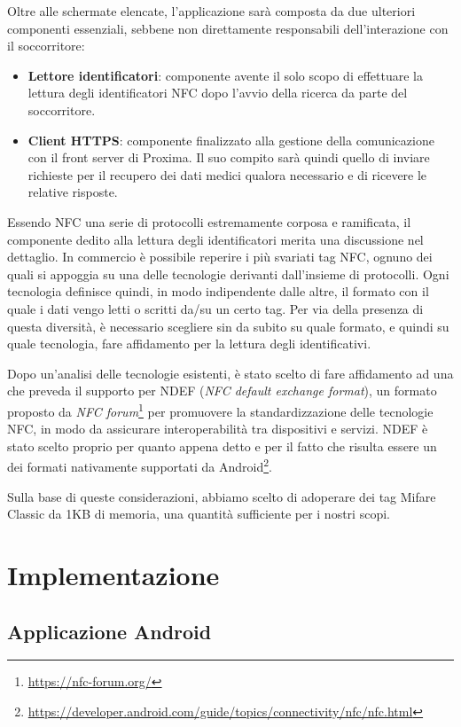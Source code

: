 \documentclass[a4paper,12pt]{report}
\begin{document}
Oltre alle schermate elencate, l'applicazione sarà composta da due ulteriori componenti essenziali, sebbene non direttamente responsabili dell'interazione con il soccorritore:
\begin{itemize}
	\item \textbf{Lettore identificatori}: componente avente il solo scopo di effettuare la lettura degli identificatori NFC dopo l'avvio della ricerca da parte del soccorritore.
	\item \textbf{Client HTTPS}: componente finalizzato alla gestione della comunicazione con il front server di Proxima. Il suo compito sarà quindi quello di inviare richieste per il recupero dei dati medici qualora necessario e di ricevere le relative risposte.  
\end{itemize}

Essendo NFC una serie di protocolli estremamente corposa e ramificata, il componente dedito alla lettura degli identificatori merita una discussione nel dettaglio. In commercio è possibile reperire i più svariati tag NFC, ognuno dei quali si appoggia su una delle tecnologie derivanti dall'insieme di protocolli. Ogni tecnologia definisce quindi, in modo indipendente dalle altre, il formato con il quale i dati vengo letti o scritti da/su un certo tag. Per via della presenza di questa diversità, è necessario scegliere sin da subito su quale formato, e quindi su quale tecnologia, fare affidamento per la lettura degli identificativi.

Dopo un'analisi delle tecnologie esistenti, è stato scelto di fare affidamento ad una che preveda il supporto per NDEF (\emph{NFC default exchange format}), un formato proposto da \emph{NFC forum}\footnote{\url{https://nfc-forum.org/}} per promuovere la standardizzazione delle tecnologie NFC, in modo da assicurare interoperabilità tra dispositivi e servizi. NDEF è stato scelto proprio per quanto appena detto e per il fatto che risulta essere un dei formati nativamente supportati da Android\footnote{\url{https://developer.android.com/guide/topics/connectivity/nfc/nfc.html}}.

Sulla base di queste considerazioni, abbiamo scelto di adoperare dei tag Mifare Classic da 1KB di memoria, una quantità sufficiente per i nostri scopi.
\chapter{Implementazione}

\section{Applicazione Android}
\end{document}
